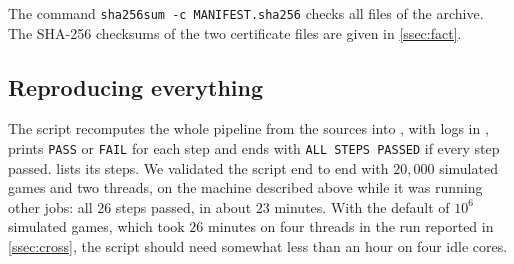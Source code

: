 The command \texttt{sha256sum -c MANIFEST.sha256} checks all files of the archive. The SHA-256
checksums of the two certificate files are given in \cref{ssec:fact}.

\subsection{Reproducing everything}\label{ssec:reproduce}

The script  recomputes the whole pipeline from the sources into
, with logs in , prints \texttt{PASS} or \texttt{FAIL} for each step and
ends with \texttt{ALL STEPS PASSED} if every step passed.  lists its steps. We validated
the script end to end with $20{,}000$ simulated games and two threads, on the machine described above
while it was running other jobs: all $26$ steps passed, in about $23$ minutes. With the default of
$10^6$ simulated games, which took $26$ minutes on four threads in the run reported in \cref{ssec:cross},
the script should need somewhat less than an hour on four idle cores.


